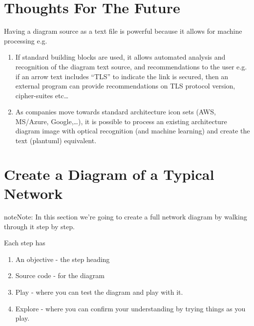 \documentclass[letterpaper,10pt,english]{sphinxmanual}
\begin{document}
\section{Thoughts For The Future}
\label{\detokenize{about/future:thoughts-for-the-future}}\label{\detokenize{about/future::doc}}
Having a diagram source as a text file is powerful because it allows for machine processing e.g.
\begin{enumerate}
%
\item {} 
If standard building blocks are used, it allows automated analysis and recognition of the diagram text source, and recommendations to the user e.g.
if an arrow text includes “TLS” to indicate the link is secured, then an external program can provide recommendations on TLS protocol version, cipher-suites etc…

\item {} 
As companies move towards standard architecture icon sets (AWS, MS/Azure, Google,…), it is possible to process an existing architecture diagram image with optical recognition (and machine learning) and create the text (plantuml) equivalent.

\end{enumerate}


\section{Create a Diagram of a Typical Network}
\label{\detokenize{NetworkUsersMachines/NetworkUsersMachines:create-a-diagram-of-a-typical-network}}\label{\detokenize{NetworkUsersMachines/NetworkUsersMachines::doc}}
\begin{sphinxadmonition}{note}{Note:}
In this section we’re going to create a full network diagram by walking through it step by step.

Each step has
\begin{enumerate}
%
\item {} 
An objective - the step heading

\item {} 
Source code - for the diagram

\item {} 
Play - where you can test the diagram and play with it.

\item {} 
Explore - where you can confirm your understanding by trying things as you play.

\end{enumerate}
\end{sphinxadmonition}
\end{document}
